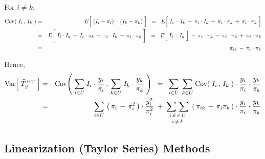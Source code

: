 \noindent
For $i \neq k$,
\begin{eqnarray*}
\Cov\!\left(\;I_{i}\,,\,I_{k}\;\right)
& = &
	E\!\left[\;\left(I_{i}-\pi_{i}\right)\overset{{\color{white}-}}{\cdot}\left(I_{k}-\pi_{k}\right)\;\right]
\;\; = \;\;
	E\!\left[\;
		I_{i} \overset{{\color{white}-}}{\cdot} I_{k}
		\, - \, \pi_{i} \cdot I_{k}
		\, - \, \pi_{i} \cdot \pi_{k}
		\, + \, \pi_{i} \cdot \pi_{k}
		\;\right]
\\
& = &
	E\!\left[\;
		I_{i} \overset{{\color{white}\vert}}{\cdot} I_{k}
		\, - \, I_{i} \cdot \pi_{k}
		\, - \, \pi_{i} \cdot I_{k}
		\, + \, \pi_{i} \cdot \pi_{k}
		\;\right]
\;\; = \;\;
	E\!\left[\; I_{i} \overset{{\color{white}-}}{\cdot} I_{k} \;\right]
		\, - \, \pi_{i} \cdot \pi_{k}
		\, - \, \pi_{i} \cdot \pi_{k}
		\, + \, \pi_{i} \cdot \pi_{k}
\\
& = &
	\pi_{ik} \, - \, \pi_{i} \cdot \pi_{k} 
\end{eqnarray*}

\noindent
Hence,
\begin{eqnarray*}
\textnormal{Var}\!\left[\;\widehat{T}^{\,\textnormal{HT}}_{y}\;\right]
& = &
	\textnormal{Cov}\!\left(\;
		\underset{i \in U}{\sum}\; I_{i}\cdot\dfrac{y_{i}}{\pi_{i}}
		\,,\,
		\underset{k \in U}{\sum}\; I_{k}\cdot\dfrac{y_{k}}{\pi_{k}}
		\;\right)
\;\; = \;\;
	\underset{i \in U}{\sum}\;\,
	\underset{k \in U}{\sum}\;
		\textnormal{Cov}\!\left(\;I_{i}\,,\,I_{k}\;\right)
		\cdot\dfrac{y_{i}}{\pi_{i}}
		\cdot\dfrac{y_{k}}{\pi_{k}}
\\
& = &
	\underset{i \in U}{\sum}\,
		\left(\,\pi_{i}\,-\,\pi_{i}^{2}\,\right) \cdot \dfrac{y_{i}^{2}}{\pi_{i}^{2}}
	\; + \;
	\underset{i \, \neq \, k}{\underset{i , k \,\in\,U}{\sum\,\sum}}\;
		\left(\,\pi_{ik} \, - \, \pi_{i}\pi_{k}\,\right)
		\cdot\dfrac{y_{i}}{\pi_{i}}
		\cdot\dfrac{y_{k}}{\pi_{k}}
\end{eqnarray*}


\subsection{Linearization (Taylor Series) Methods}


\renewcommand{\theenumi}{\roman{enumi}}
\renewcommand{\labelenumi}{\textnormal{(\theenumi)}$\;\;$}

